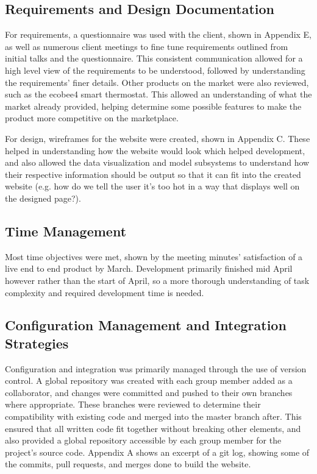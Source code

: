 \documentclass[]{report}
\begin{document}
	\subsection{Requirements and Design Documentation}
	For requirements, a questionnaire was used with the client, shown in Appendix E, as well as numerous client meetings to fine tune requirements outlined from initial talks and the questionnaire. This consistent communication allowed for a high level view of the requirements to be understood, followed by understanding the requirements' finer details. Other products on the market were also reviewed, such as the ecobee4\cite{ecobee4} smart thermostat. This allowed an understanding of what the market already provided, helping determine some possible features to make the product more competitive on the marketplace.
	\medskip
	
	For design, wireframes for the website were created, shown in Appendix C. These helped in understanding how the website would look which helped development, and also allowed the data visualization and model subsystems to understand how their respective information should be output so that it can fit into the created website (e.g. how do we tell the user it's too hot in a way that displays well on the designed page?).
	
	\subsection{Time Management}
	Most time objectives were met, shown by the meeting minutes' satisfaction of a live end to end product by March. Development primarily finished mid April however rather than the start of April, so a more thorough understanding of task complexity and required development time is needed.
	
	\subsection{Configuration Management and Integration Strategies}
	Configuration and integration was primarily managed through the use of version control. A global repository was created with each group member added as a collaborator, and changes were committed and pushed to their own branches where appropriate. These branches were reviewed to determine their compatibility with existing code and merged into the master branch after. This ensured that all written code fit together without breaking other elements, and also provided a global repository accessible by each group member for the project's source code. Appendix A shows an excerpt of a git log, showing some of the commits, pull requests, and merges done to build the website. 
	
\end{document}
